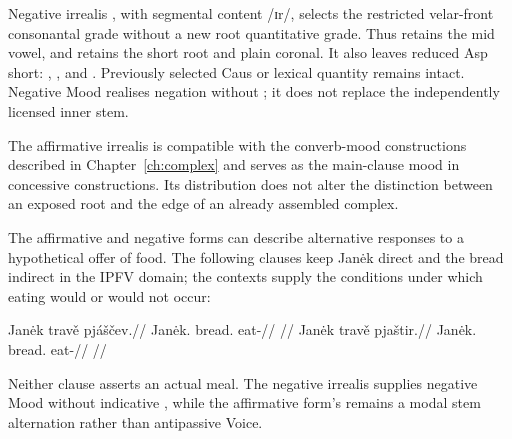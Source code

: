 Negative irrealis , with segmental content /ɪr/, selects the
restricted velar-front consonantal grade without a new root quantitative grade. Thus
 retains the mid vowel, and  retains
the short root and plain coronal. It also leaves reduced Asp
 short: ,
, and . Previously selected
Caus or lexical quantity remains intact. Negative Mood realises
negation without ; it does not replace the independently
licensed inner stem.

\pex
\a {} 
\a {} 
\xe

The affirmative irrealis is compatible with the converb-mood
constructions described in Chapter~\ref{ch:complex} and serves as the
main-clause mood in concessive constructions. Its distribution does
not alter the distinction between an exposed root and the edge of an
already assembled complex.

The affirmative and negative forms can describe alternative responses to a
hypothetical offer of food. The following clauses keep Janėk direct and the
bread indirect in the IPFV domain; the contexts supply the conditions under
which eating would or would not occur:

\pex\label{ex:irrealis-food-offer}
\a
\begingl
\gla Janėk travě pjáščev.//
\glb Janėk.\Dir{} bread.\Ind{} eat-\Irr{}//
\glft {}
//
\endgl
\a
\begingl
\gla Janėk travě pjaštir.//
\glb Janėk.\Dir{} bread.\Ind{} eat-\NIrr{}//
\glft {}
//
\endgl
\xe

Neither clause asserts an actual meal. The negative irrealis supplies
negative Mood without indicative , while the affirmative form's
 remains a modal stem alternation rather than antipassive Voice.
